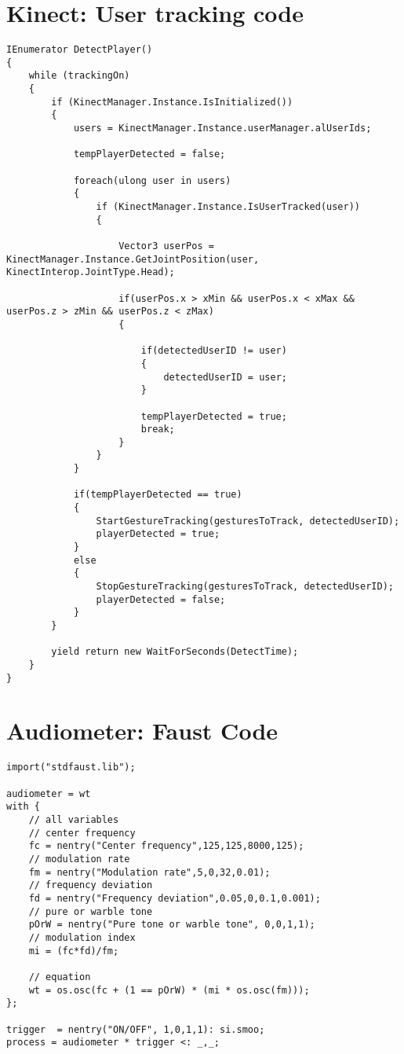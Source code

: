 \onecolumn
\begin{appendices}
\section{Kinect: User tracking code} \label{appendix: UserTrackingCode}
\begin{lstlisting}[linewidth=\columnwidth,breaklines=true]
IEnumerator DetectPlayer()
{
    while (trackingOn)
    {
        if (KinectManager.Instance.IsInitialized())
        {
            users = KinectManager.Instance.userManager.alUserIds;

            tempPlayerDetected = false; 

            foreach(ulong user in users)
            {
                if (KinectManager.Instance.IsUserTracked(user))
                {

                    Vector3 userPos = KinectManager.Instance.GetJointPosition(user, KinectInterop.JointType.Head);

                    if(userPos.x > xMin && userPos.x < xMax && userPos.z > zMin && userPos.z < zMax)
                    {

                        if(detectedUserID != user)
                        {
                            detectedUserID = user;
                        }

                        tempPlayerDetected = true;
                        break;
                    }
                }
            }

            if(tempPlayerDetected == true)
            {
                StartGestureTracking(gesturesToTrack, detectedUserID);
                playerDetected = true;
            }
            else
            {
                StopGestureTracking(gesturesToTrack, detectedUserID);
                playerDetected = false;
            }
        }

        yield return new WaitForSeconds(DetectTime);
    }
}
\end{lstlisting}

\newpage
\section{Audiometer: Faust Code} \label{appendix:faustCode}
\begin{lstlisting}[linewidth=\columnwidth,breaklines=true]
import("stdfaust.lib");

audiometer = wt
with {
    // all variables
    // center frequency
    fc = nentry("Center frequency",125,125,8000,125);
    // modulation rate
    fm = nentry("Modulation rate",5,0,32,0.01); 
    // frequency deviation
    fd = nentry("Frequency deviation",0.05,0,0.1,0.001);
    // pure or warble tone
    pOrW = nentry("Pure tone or warble tone", 0,0,1,1); 
    // modulation index
    mi = (fc*fd)/fm; 
    
    // equation
    wt = os.osc(fc + (1 == pOrW) * (mi * os.osc(fm)));
};

trigger  = nentry("ON/OFF", 1,0,1,1): si.smoo;
process = audiometer * trigger <: _,_;
\end{lstlisting}
\end{appendices}
